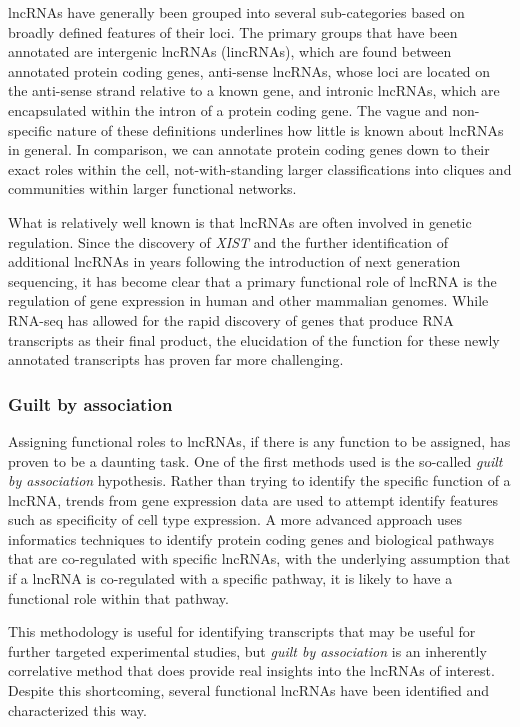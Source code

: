 lncRNAs have generally been grouped into several sub-categories based on broadly defined features of their loci. The primary groups that have been annotated are intergenic lncRNAs (lincRNAs), which are found between annotated protein coding genes, anti-sense lncRNAs, whose loci are located on the anti-sense strand relative to a known gene, and intronic lncRNAs, which are encapsulated within the intron of a protein coding gene. The vague and non-specific nature of these definitions underlines how little is known about lncRNAs in general. In comparison, we can annotate protein coding genes down to their exact roles within the cell, not-with-standing larger classifications into cliques and communities within larger functional networks. 

What is relatively well known is that lncRNAs are often involved in genetic regulation. Since the discovery of \emph{XIST} and the further identification of additional lncRNAs in years following the introduction of next generation sequencing, it has become clear that a primary functional role of lncRNA is the regulation of gene expression in human and other mammalian genomes. While RNA-seq has allowed for the rapid discovery of genes that produce RNA transcripts as their final product, the elucidation of the function for these newly annotated transcripts has proven far more challenging. 

\subsubsection{Guilt by association}
Assigning functional roles to lncRNAs, if there is any function to be assigned, has proven to be a daunting task. One of the first methods used is the so-called \emph{guilt by association} hypothesis. Rather than trying to identify the specific function of a lncRNA, trends from gene expression data are used to attempt identify features such as specificity of cell type expression. A more advanced approach uses informatics techniques to identify protein coding genes and biological pathways that are co-regulated with specific lncRNAs, with the underlying assumption that if a lncRNA is co-regulated with a specific pathway, it is likely to have a functional role within that pathway. 

This methodology is useful for identifying transcripts that may be useful for further targeted experimental studies, but \emph{guilt by association} is an inherently correlative method that does provide real insights into the lncRNAs of interest. Despite this shortcoming, several functional lncRNAs have been identified and characterized this way. 

